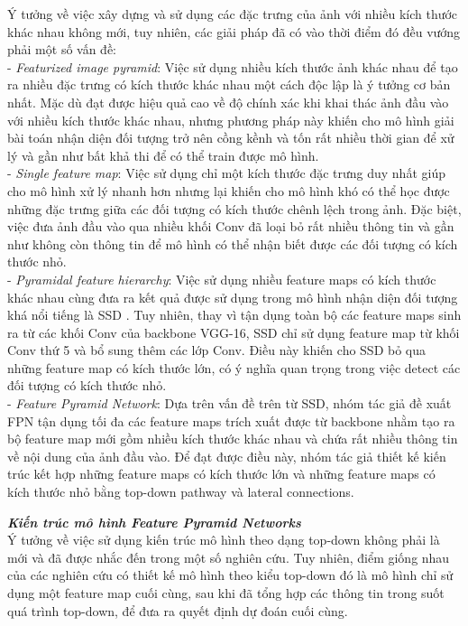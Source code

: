 {    \noindent
    Ý tưởng về việc xây dựng và sử dụng các đặc trưng của ảnh với nhiều kích thước khác nhau không mới, tuy nhiên, các giải pháp đã có vào thời điểm đó đều vướng phải một số vấn đề: \\
    - \textit{Featurized image pyramid}: Việc sử dụng nhiều kích thước ảnh khác nhau để tạo ra nhiều đặc trưng có kích thước khác nhau một cách độc lập là ý tưởng cơ bản nhất. Mặc dù đạt được hiệu quả cao về độ chính xác khi khai thác ảnh đầu vào với nhiều kích thước khác nhau, nhưng phương pháp này khiến cho mô hình giải bài toán nhận diện đối tượng trở nên cồng kềnh và tốn rất nhiều thời gian để xử lý và gần như bất khả thi để có thể train được mô hình. \\
    - \textit{Single feature map}: Việc sử dụng chỉ một kích thước đặc trưng duy nhất giúp cho mô hình xử lý nhanh hơn nhưng lại khiến cho mô hình khó có thể học được những đặc trưng giữa các đối tượng có kích thước chênh lệch trong ảnh. Đặc biệt, việc đưa ảnh đầu vào qua nhiều khối Conv đã loại bỏ rất nhiều thông tin và gần như không còn thông tin để mô hình có thể nhận biết được các đối tượng có kích thước nhỏ. \\
    - \textit{Pyramidal feature hierarchy}: Việc sử dụng nhiều feature maps có kích thước khác nhau cùng đưa ra kết quả được sử dụng trong mô hình nhận diện đối tượng khá nổi tiếng là SSD \cite{liu2016ssd}. Tuy nhiên, thay vì tận dụng toàn bộ các feature maps sinh ra từ các khối Conv của backbone VGG-16, SSD chỉ sử dụng feature map từ khối Conv thứ 5 và bổ sung thêm các lớp Conv. Điều này khiến cho SSD bỏ qua những feature map có kích thước lớn, có ý nghĩa quan trọng trong việc detect các đối tượng có kích thước nhỏ. \\
    - \textit{Feature Pyramid Network}: Dựa trên vấn đề trên từ SSD, nhóm tác giả đề xuất FPN tận dụng tối đa các feature maps trích xuất được từ backbone nhằm tạo ra bộ feature map mới gồm nhiều kích thước khác nhau và chứa rất nhiều thông tin về nội dung của ảnh đầu vào. Để đạt được điều này, nhóm tác giả thiết kế kiến trúc kết hợp những feature maps có kích thước lớn và những feature maps có kích thước nhỏ bằng top-down pathway và lateral connections.

    \noindent
    \textbf{\textit{Kiến trúc mô hình Feature Pyramid Networks}} \\
    Ý tưởng về việc sử dụng kiến trúc mô hình theo dạng top-down không phải là mới và đã được nhắc đến trong một số nghiên cứu. Tuy nhiên, điểm giống nhau của các nghiên cứu có thiết kế mô hình theo kiểu top-down đó là mô hình chỉ sử dụng một feature map cuối cùng, sau khi đã tổng hợp các thông tin trong suốt quá trình top-down, để đưa ra quyết định dự đoán cuối cùng.

}
